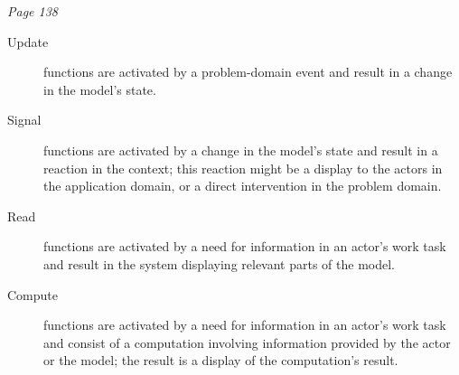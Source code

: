 \textit{Page 138}
\begin{description}
    \item[Update] functions are activated by a problem-domain event and result in a change in the model's state.
    \item[Signal] functions are activated by a change in the model's state and result in a reaction in the context; this reaction might be a display to the actors in the application domain, or a direct intervention in the problem domain.
    \item[Read] functions are activated by a need for information in an actor's work task and result in the system displaying relevant parts of the model.
    \item[Compute] functions are activated by a need for information in an actor's work task and consist of a computation involving information provided by the actor or the model; the result is a display of the computation's result.
\end{description}